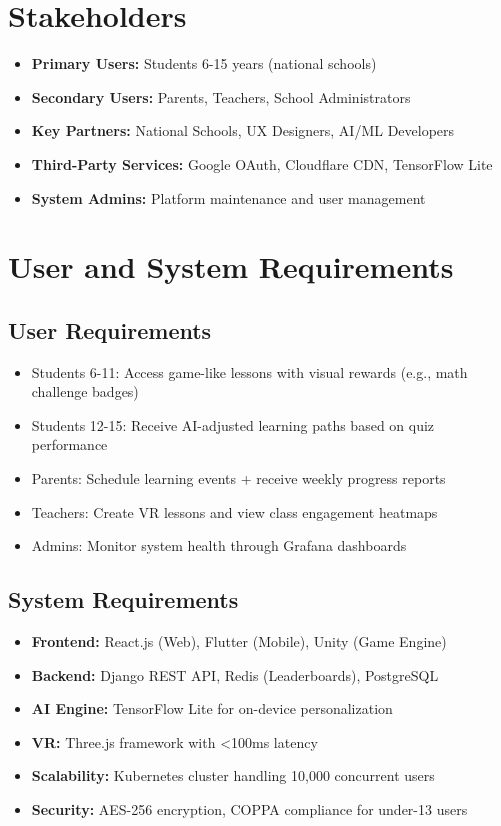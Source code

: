 \documentclass[12pt,a4paper]{article}
\begin{document}
\section{Stakeholders}
\begin{itemize}[leftmargin=*]
  \item \textbf{Primary Users:} Students 6-15 years (national schools)
  \item \textbf{Secondary Users:} Parents, Teachers, School Administrators
  \item \textbf{Key Partners:} National Schools, UX Designers, AI/ML Developers
  \item \textbf{Third-Party Services:} Google OAuth, Cloudflare CDN, TensorFlow Lite
  \item \textbf{System Admins:} Platform maintenance and user management
\end{itemize}

\section{User and System Requirements}
\subsection{User Requirements}
\begin{itemize}[leftmargin=*]
  \item Students 6-11: Access game-like lessons with visual rewards (e.g., math challenge badges)
  \item Students 12-15: Receive AI-adjusted learning paths based on quiz performance
  \item Parents: Schedule learning events + receive weekly progress reports
  \item Teachers: Create VR lessons and view class engagement heatmaps
  \item Admins: Monitor system health through Grafana dashboards
\end{itemize}

\subsection{System Requirements}
\begin{itemize}[leftmargin=*]
  \item \textbf{Frontend:} React.js (Web), Flutter (Mobile), Unity (Game Engine)
  \item \textbf{Backend:} Django REST API, Redis (Leaderboards), PostgreSQL
  \item \textbf{AI Engine:} TensorFlow Lite for on-device personalization
  \item \textbf{VR:} Three.js framework with <100ms latency
  \item \textbf{Scalability:} Kubernetes cluster handling 10,000 concurrent users
  \item \textbf{Security:} AES-256 encryption, COPPA compliance for under-13 users
\end{itemize}
\end{document}
